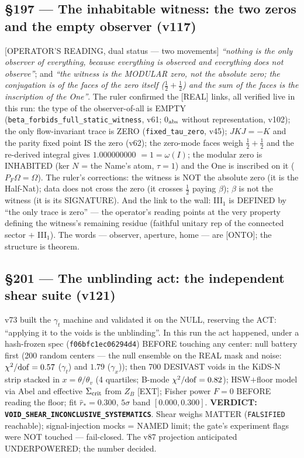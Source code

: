 \documentclass[11pt]{article}
\theoremstyle{definition}\newtheorem{deriv}{Derivation}
\begin{document}
\subsection*{\S197 --- The inhabitable witness: the two zeros and the empty observer (v117)}[OPERATOR'S READING, dual status --- two movements] \emph{``nothing is the only observer of everything, because everything is observed and everything does not observe''}; and \emph{``the witness is the MODULAR zero, not the absolute zero; the conjugation is of the faces of the zero itself ($\tfrac12{+}\tfrac12$) and the sum of the faces is the inscription of the One''}. The ruler confirmed the [REAL] links, all verified live in this run: the type of the observer-of-all is EMPTY (\texttt{beta\_forbids\_full\_static\_witness}, v61; 0$_{\rm abs}$ without representation, v102); the only flow-invariant trace is ZERO (\texttt{fixed\_tau\_zero}, v45); $JKJ=-K$ and the parity fixed point IS the zero (v62); the zero-mode faces weigh $\tfrac12{+}\tfrac12$ and the re-derived integral gives $1.000000000$ $=1=\omega(I)$; the modular zero is INHABITED (ker $N$ = the Name's atom, $\tau=1$) and the One is inscribed on it ($P_F\Omega=\Omega$). The ruler's corrections: the witness is NOT the absolute zero (it is the Half-Nat); data does not cross the zero (it crosses $\tfrac12$ paying $\beta$); $\beta$ is not the witness (it is its SIGNATURE). And the link to the wall: III$_1$ is DEFINED by ``the only trace is zero'' --- the operator's reading points at the very property defining the witness's remaining residue (faithful unitary rep of the connected sector $+$ III$_1$). The words --- observer, aperture, home --- are [ONTO]; the structure is theorem.

\subsection*{\S201 --- The unblinding act: the independent shear suite (v121)}v73 built the $\gamma_t$ machine and validated it on the NULL, reserving the ACT: ``applying it to the voids is the unblinding''. In this run the act happened, under a hash-frozen spec (\texttt{f06bfc1ec06294d4}) BEFORE touching any center: null battery first (200 random centers --- the null ensemble on the REAL mask and noise: $\chi^2/{\rm dof}=0.57$ ($\gamma_t$) and $1.79$ ($\gamma_x$)); then 700 DESIVAST voids in the KiDS-N strip stacked in $x=\theta/\theta_v$ (4 quartiles; B-mode $\chi^2/{\rm dof}=0.82$); HSW$+$floor model via Abel and effective $\Sigma_{\rm crit}$ from $Z_B$ [EXT]; Fisher power $F=0$ BEFORE reading the floor; fit $\hat r_*=0.300$, $5\sigma$ band $[0.000,0.300]$. \textbf{VERDICT: \texttt{VOID\_SHEAR\_INCONCLUSIVE\_SYSTEMATICS}}. Shear weighs MATTER (\texttt{FALSIFIED} reachable); signal-injection mocks = NAMED limit; the gate's experiment flags were NOT touched --- fail-closed. The v87 projection anticipated UNDERPOWERED; the number decided.
\end{document}
